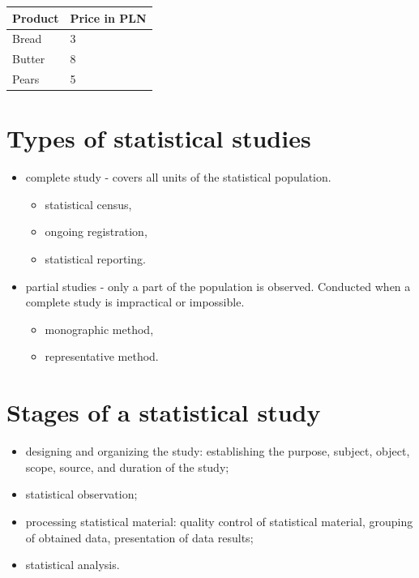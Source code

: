 \documentclass[
  english,
  letterpaper,
  DIV=11,
  numbers=noendperiod]{scrreprt}
\newcounter{none} %
\providecommand{\tightlist}{%
  \setlength{\itemsep}{0pt}\setlength{\parskip}{0pt}}
\begin{document}
{\def\LTcaptype{none} %
\begin{longtable}[]{@{}ll@{}}
\toprule\noalign{}
Product & Price in PLN \\
\midrule\noalign{}
\endhead
\bottomrule\noalign{}
\endlastfoot
Bread & 3 \\
Butter & 8 \\
Pears & 5 \\
\end{longtable}
}

\section{Types of statistical
studies}\label{types-of-statistical-studies}

\begin{itemize}
\tightlist
\item
  complete study - covers all units of the statistical population.

  \begin{itemize}
  \tightlist
  \item
    statistical census,
  \item
    ongoing registration,
  \item
    statistical reporting.
  \end{itemize}
\item
  partial studies - only a part of the population is observed. Conducted
  when a complete study is impractical or impossible.

  \begin{itemize}
  \tightlist
  \item
    monographic method,
  \item
    representative method.
  \end{itemize}
\end{itemize}

\section{Stages of a statistical
study}\label{stages-of-a-statistical-study}

\begin{itemize}
\tightlist
\item
  designing and organizing the study: establishing the purpose, subject,
  object, scope, source, and duration of the study;
\item
  statistical observation;
\item
  processing statistical material: quality control of statistical
  material, grouping of obtained data, presentation of data results;
\item
  statistical analysis.
\end{itemize}
\end{document}

